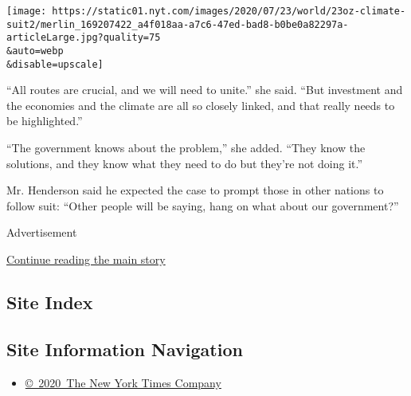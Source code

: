 \texttt{[image: https://static01.nyt.com/images/2020/07/23/world/23oz-climate-suit2/merlin\_169207422\_a4f018aa-a7c6-47ed-bad8-b0be0a82297a-articleLarge.jpg?quality=75\\\&auto=webp\\\&disable=upscale]}

``All routes are crucial, and we will need to unite.'' she said. ``But
investment and the economies and the climate are all so closely linked,
and that really needs to be highlighted.''

``The government knows about the problem,'' she added. ``They know the
solutions, and they know what they need to do but they're not doing
it.''

Mr. Henderson said he expected the case to prompt those in other nations
to follow suit: ``Other people will be saying, hang on what about our
government?''

Advertisement

\protect\hyperlink{after-bottom}{Continue reading the main story}

\hypertarget{site-index}{%
\subsection{Site Index}\label{site-index}}

\hypertarget{site-information-navigation}{%
\subsection{Site Information
Navigation}\label{site-information-navigation}}

\begin{itemize}
\tightlist
\item
  \href{https://help.nytimes.com/hc/en-us/articles/115014792127-Copyright-notice}{©~2020~The
  New York Times Company}
\end{itemize}

